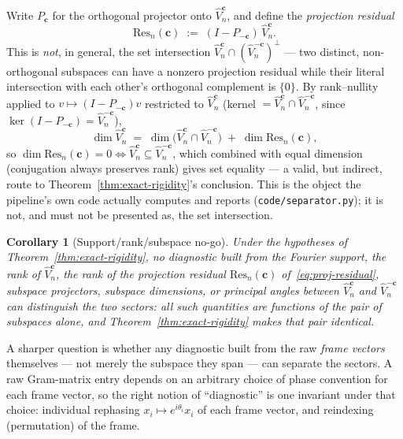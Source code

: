 \documentclass[11pt,a4paper]{article}
\newtheorem{corollary}[theorem]{Corollary}
\begin{document}
    Write $P_{\mathbf c}$ for the orthogonal projector onto $\widehat V_n^{\mathbf c}$, and define the
    \emph{projection residual}
    \begin{equation}
      \label{eq:proj-residual}
      \mathrm{Res}_n(\mathbf c) \;:=\; (I - P_{-\mathbf c})\, \widehat V_n^{\mathbf c}.
    \end{equation}
    This is \emph{not}, in general, the set intersection $\widehat V_n^{\mathbf c} \cap
    (\widehat V_n^{-\mathbf c})^\perp$ --- two distinct, non-orthogonal subspaces can have a nonzero
    projection residual while their literal intersection with each other's orthogonal complement is
    $\{0\}$. By rank--nullity applied to $v \mapsto (I-P_{-\mathbf c})v$ restricted to
    $\widehat V_n^{\mathbf c}$ (kernel $= \widehat V_n^{\mathbf c} \cap \widehat V_n^{-\mathbf c}$,
    since $\ker(I-P_{-\mathbf c}) = \widehat V_n^{-\mathbf c}$),
    \begin{equation}
      \dim \widehat V_n^{\mathbf c}
      \;=\; \dim\bigl(\widehat V_n^{\mathbf c} \cap \widehat V_n^{-\mathbf c}\bigr)
      \;+\; \dim \mathrm{Res}_n(\mathbf c),
    \end{equation}
    so $\dim \mathrm{Res}_n(\mathbf c) = 0 \iff \widehat V_n^{\mathbf c} \subseteq \widehat V_n^{-\mathbf c}$,
    which combined with equal dimension (conjugation always preserves rank) gives set equality --- a
    valid, but indirect, route to Theorem~\ref{thm:exact-rigidity}'s conclusion. This is the object the
    pipeline's own code actually computes and reports (\texttt{code/separator.py}); it is not, and must
    not be presented as, the set intersection.

    \begin{corollary}[Support/rank/subspace no-go]
      \label{cor:support-rank-nogo}
      Under the hypotheses of Theorem~\ref{thm:exact-rigidity}, no diagnostic built from the Fourier
      support, the rank of $\widehat V_n^{\mathbf{c}}$, the rank of the projection residual
      $\mathrm{Res}_n(\mathbf c)$ of~\eqref{eq:proj-residual}, subspace projectors, subspace
      dimensions, or principal angles between $\widehat V_n^{\mathbf{c}}$ and
      $\widehat V_n^{-\mathbf{c}}$ can distinguish the two sectors: all such quantities are functions
      of the pair of subspaces alone, and Theorem~\ref{thm:exact-rigidity} makes that pair identical.
    \end{corollary}

    A sharper question is whether any diagnostic built from the raw \emph{frame vectors} themselves
    --- not merely the subspace they span --- can separate the sectors. A raw Gram-matrix entry
    depends on an arbitrary choice of phase convention for each frame vector, so the right notion of
    ``diagnostic'' is one invariant under that choice: individual rephasing
    $x_i \mapsto e^{i\theta_i} x_i$ of each frame vector, and reindexing (permutation) of the frame.
\end{document}
